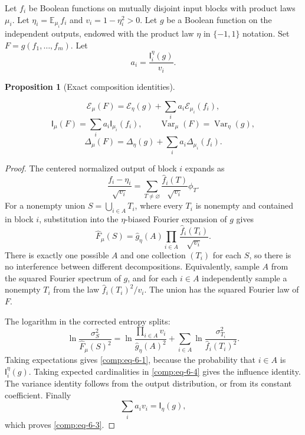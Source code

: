 \documentclass[11pt]{amsart}
\newtheorem{proposition}[theorem]{Proposition}
\theoremstyle{definition}
\theoremstyle{remark}
\newcommand{\I}{\mathsf I}
\begin{document}
Let \(f_i\) be Boolean functions on mutually disjoint input blocks with product laws \(\mu_i\). Let \(\eta_i=\mathbb E_{\mu_i}f_i\) and \(v_i=1-\eta_i^2>0\). Let \(g\) be a Boolean function on the independent outputs, endowed with the product law \(\eta\) in \(\{-1,1\}\) notation. Set \(F=g(f_1,\ldots,f_m)\). Let \[
 a_i=\frac{\I_i^\eta(g)}{v_i}.
\]

\begin{proposition}[Exact composition identities]\label{comp:identities}

\begin{equation}\label{comp:eq-6-1}
\mathcal E_\mu(F)=\mathcal E_\eta(g)
                   +\sum_i a_i\mathcal E_{\mu_i}(f_i),
\end{equation} \begin{equation}\label{comp:eq-6-2}
\I_\mu(F)=\sum_i a_i \I_{\mu_i}(f_i),
 \qquad
 \operatorname{Var}_\mu(F)=\operatorname{Var}_\eta(g),
\end{equation} \begin{equation}\label{comp:eq-6-3}
\Delta_\mu(F)=\Delta_\eta(g)+\sum_i a_i\Delta_{\mu_i}(f_i).
\end{equation}

\end{proposition}
\begin{proof}

The centered normalized output of block \(i\) expands as \[
 \frac{f_i-\eta_i}{\sqrt{v_i}}
    =\sum_{T\ne\varnothing}
           \frac{\widehat f_i(T)}{\sqrt{v_i}}\phi_T.
\] For a nonempty union \(S=\bigcup_{i\in A}T_i\), where every \(T_i\) is nonempty and contained in block \(i\), substitution into the \(\eta\)-biased Fourier expansion of \(g\) gives \begin{equation}\label{comp:eq-6-4}
\widehat F_\mu(S)
    =\widehat g_\eta(A)
        \prod_{i\in A}\frac{\widehat f_i(T_i)}{\sqrt{v_i}}.
\end{equation} There is exactly one possible \(A\) and one collection \((T_i)\) for each \(S\), so there is no interference between different decompositions. Equivalently, sample \(A\) from the squared Fourier spectrum of \(g\), and for each \(i\in A\) independently sample a nonempty \(T_i\) from the law \(\widehat f_i(T_i)^2/v_i\). The union has the squared Fourier law of \(F\).

The logarithm in the corrected entropy splits: \[
 \ln\frac{\sigma_S^2}{\widehat F_\mu(S)^2}
 =
 \ln\frac{\prod_{i\in A}v_i}{\widehat g_\eta(A)^2}
  +\sum_{i\in A}
       \ln\frac{\sigma_{T_i}^2}{\widehat f_i(T_i)^2}.
\] Taking expectations gives \eqref{comp:eq-6-1}, because the probability that \(i\in A\) is \(\I_i^\eta(g)\). Taking expected cardinalities in \eqref{comp:eq-6-4} gives the influence identity. The variance identity follows from the output distribution, or from its constant coefficient. Finally \[
 \sum_i a_iv_i=\I_\eta(g),
\] which proves \eqref{comp:eq-6-3}.

\end{proof}
\end{document}
